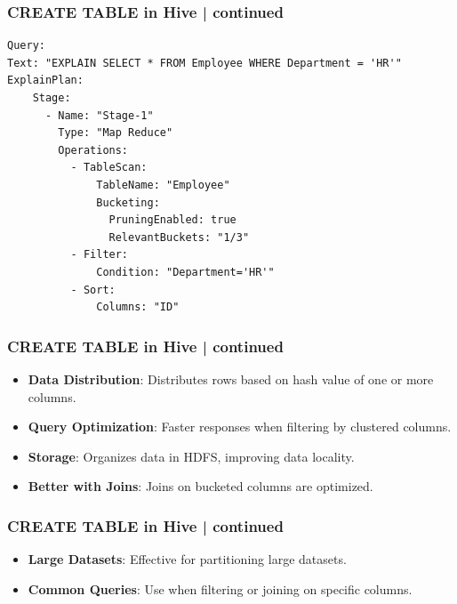 \begin{frame}[fragile]
\frametitle{CREATE TABLE in Hive | continued}    
\vspace{-0.5cm}

\begin{tcolorbox}[colback=white,colframe=black,title= Part 6: Clustering and Sorting | SORTED BY]
	\small
\begin{lstlisting}[caption={Simplified Explain Plan: With CLUSTERED BY and SORT BY},style=my-yamll]
Query: 
Text: "EXPLAIN SELECT * FROM Employee WHERE Department = 'HR'"
ExplainPlan:
    Stage:
      - Name: "Stage-1"
        Type: "Map Reduce"
        Operations:
          - TableScan: 
              TableName: "Employee"
              Bucketing: 
                PruningEnabled: true
                RelevantBuckets: "1/3"
          - Filter: 
              Condition: "Department='HR'"
          - Sort:
              Columns: "ID"    
\end{lstlisting}
\end{tcolorbox}
\end{frame}


\begin{frame}[fragile]
\frametitle{CREATE TABLE in Hive | continued}    
\vspace{-0.5cm}

\begin{tcolorbox}[colback=white,colframe=black,title= Part 6: Clustering and Sorting | Clustered By: Key Points]
		\begin{itemize}
		\item \textbf{Data Distribution}: Distributes rows based on hash value of one or more columns.
		\item \textbf{Query Optimization}: Faster responses when filtering by clustered columns.
		\item \textbf{Storage}: Organizes data in HDFS, improving data locality.
		\item \textbf{Better with Joins}: Joins on bucketed columns are optimized.
		\end{itemize}
\end{tcolorbox}
\end{frame}

\begin{frame}[fragile]
\frametitle{CREATE TABLE in Hive | continued}    
\vspace{-0.5cm}
\begin{tcolorbox}[colback=white,colframe=black,title= Part 6: Clustering and Sorting | Clustered By: When to Use]
		\begin{itemize}
			\item \textbf{Large Datasets}: Effective for partitioning large datasets.
			\item \textbf{Common Queries}: Use when filtering or joining on specific columns.
		\end{itemize}
\end{tcolorbox}
\end{frame}
		
